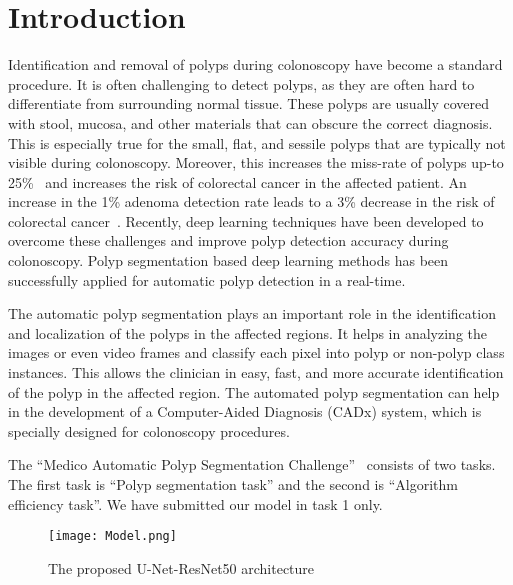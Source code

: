 \documentclass[sigconf]{acmart-me}
\begin{document}
\maketitle



\section{Introduction}
\label{sec:intro}
Identification and removal of polyps during colonoscopy have become a standard procedure. It is often challenging to detect polyps, as they are often hard to differentiate from surrounding normal tissue. These polyps are usually covered with stool, mucosa, and other materials that can obscure the correct diagnosis. This is especially true for the small, flat, and sessile polyps that are typically not visible during colonoscopy. Moreover, this increases the miss-rate of polyps up-to 25\%~\cite{kumar2017adenoma} and increases the risk of colorectal cancer in the affected patient. An increase in the 1\% adenoma detection rate leads to a 3\% decrease in the risk of colorectal cancer~\cite{corley2014adenoma}. Recently, deep learning techniques have been developed to overcome these challenges and improve polyp detection accuracy during colonoscopy. Polyp segmentation based deep learning methods has been successfully applied for automatic polyp detection in a real-time.

The automatic polyp segmentation plays an important role in the identification and localization of the polyps in the affected regions. It helps in analyzing the images or even video frames and classify each pixel into polyp or non-polyp class instances. This allows the clinician in easy, fast, and more accurate identification of the polyp in the affected region. The automated polyp segmentation can help in the development of a Computer-Aided Diagnosis (CADx) system, which is specially designed for colonoscopy procedures. 

The ``Medico Automatic Polyp Segmentation Challenge''~\cite{jha2020medico} consists of two tasks. The first task is ``Polyp segmentation task'' and the second is ``Algorithm efficiency task''.  We have submitted our model in task 1 only.

\begin{figure*}[h]
 \center
  \texttt{[image: Model.png]}
  \caption{The proposed U-Net-ResNet50 architecture}
  \label{fig:architecture_fig}
\end{figure*}
\end{document}
